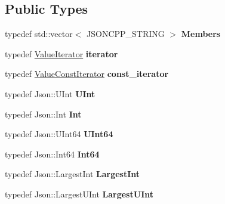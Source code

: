 \subsection*{Public Types}
\begin{DoxyCompactItemize}
\item 
typedef std\+::vector$<$ J\+S\+O\+N\+C\+P\+P\+\_\+\+S\+T\+R\+I\+NG $>$ {\bfseries Members}\hypertarget{classJson_1_1Value_a9ae9069983fc38f1928d76f9c79ac64d}{}\label{classJson_1_1Value_a9ae9069983fc38f1928d76f9c79ac64d}

\item 
typedef \hyperlink{classJson_1_1ValueIterator}{Value\+Iterator} {\bfseries iterator}\hypertarget{classJson_1_1Value_a341cdf2e01f8b3c5b7317aa2f0768c53}{}\label{classJson_1_1Value_a341cdf2e01f8b3c5b7317aa2f0768c53}

\item 
typedef \hyperlink{classJson_1_1ValueConstIterator}{Value\+Const\+Iterator} {\bfseries const\+\_\+iterator}\hypertarget{classJson_1_1Value_af92282ca92b58b320debd486afb7696a}{}\label{classJson_1_1Value_af92282ca92b58b320debd486afb7696a}

\item 
typedef Json\+::\+U\+Int {\bfseries U\+Int}\hypertarget{classJson_1_1Value_a0933d59b45793ae4aade1757c322a98d}{}\label{classJson_1_1Value_a0933d59b45793ae4aade1757c322a98d}

\item 
typedef Json\+::\+Int {\bfseries Int}\hypertarget{classJson_1_1Value_abdf7a7ff73eb130ffcab28504ffdb405}{}\label{classJson_1_1Value_abdf7a7ff73eb130ffcab28504ffdb405}

\item 
typedef Json\+::\+U\+Int64 {\bfseries U\+Int64}\hypertarget{classJson_1_1Value_a8b62564be8c087c6d18de180ff4e13e3}{}\label{classJson_1_1Value_a8b62564be8c087c6d18de180ff4e13e3}

\item 
typedef Json\+::\+Int64 {\bfseries Int64}\hypertarget{classJson_1_1Value_a1b86af9f85f0f1baa972c3319fa22695}{}\label{classJson_1_1Value_a1b86af9f85f0f1baa972c3319fa22695}

\item 
typedef Json\+::\+Largest\+Int {\bfseries Largest\+Int}\hypertarget{classJson_1_1Value_a1cbb82642ed05109b9833e49f042ece7}{}\label{classJson_1_1Value_a1cbb82642ed05109b9833e49f042ece7}

\item 
typedef Json\+::\+Largest\+U\+Int {\bfseries Largest\+U\+Int}\hypertarget{classJson_1_1Value_a6682a3684d635e03fc06ba229fa24eec}{}\label{classJson_1_1Value_a6682a3684d635e03fc06ba229fa24eec}


\end{DoxyCompactItemize}
